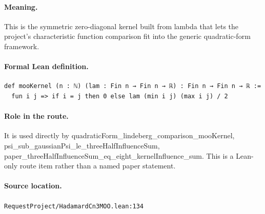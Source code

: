 \medskip
\paragraph{Meaning.}
This is the symmetric zero-diagonal kernel built from lambda that lets the project's characteristic function comparison fit into the generic quadratic-form framework.
\paragraph{Formal Lean definition.}
\begin{verbatim}
def mooKernel (n : ℕ) (lam : Fin n → Fin n → ℝ) : Fin n → Fin n → ℝ :=
  fun i j => if i = j then 0 else lam (min i j) (max i j) / 2
\end{verbatim}
\paragraph{Role in the route.}
It is used directly by quadraticForm\_lindeberg\_comparison\_mooKernel, psi\_sub\_gaussianPsi\_le\_threeHalfInfluenceSum, paper\_threeHalfInfluenceSum\_eq\_eight\_kernelInfluence\_sum. This is a Lean-only route item rather than a named paper statement.
\paragraph{Source location.}
\texttt{RequestProject/HadamardCn3MOO.lean:134}
\medskip
